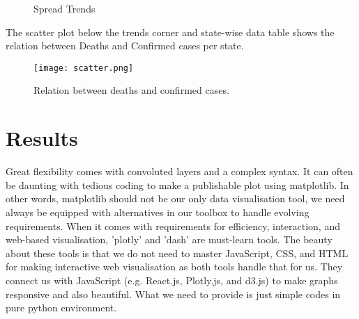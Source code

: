\documentclass[11pt,a4paper]{report}
\begin{document}
    \begin{figure}[h]
    \caption{Spread Trends}
    \end{figure}

    \vspace{1cm}
    \noindent The scatter plot below the trends corner and state-wise data table shows the relation between Deaths and Confirmed cases per state.
    \begin{figure}[h]
        \hspace*{-1cm}
        \centering
        \texttt{[image: scatter.png]}
        \caption{Relation between deaths and confirmed cases.}
    \end{figure}

    \pagebreak
    \section*{Results}
    Great flexibility comes with convoluted layers and a complex syntax. It can often be daunting with tedious coding to make a publishable plot using matplotlib. In other words, matplotlib should not be our only data visualisation tool, we need always be equipped with alternatives in our toolbox to handle evolving requirements.
    When it comes with requirements for efficiency, interaction, and web-based visualisation, 'plotly' and 'dash' are must-learn tools. The beauty about these tools is that we do not need to master JavaScript, CSS, and HTML for making interactive web visualisation as both tools handle that for us. They connect us with JavaScript (e.g. React.js, Plotly.js, and d3.js) to make graphs responsive and also beautiful. What we need to provide is just simple codes in pure python environment.
    \linebreak
\end{document}
